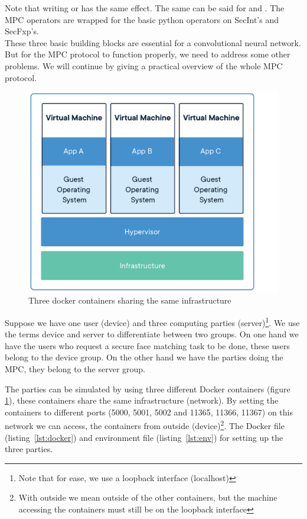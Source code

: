 Note that writing  or  has the same effect. The same can be said for  and . The MPC operators are wrapped for the basic python operators on SecInt's and SecFxp's.\\

These three basic building blocks are essential for a convolutional neural network. But for the MPC protocol to function properly, we need to address some other problems. We will continue by giving a practical overview of the whole MPC protocol.\\

\begin{figure}[H]
  \includegraphics[scale=0.25]{fig/dockercontainer.png}
  \centering
  \caption{Three docker containers sharing the same infrastructure}
  \label{fig:dockercontainer}
\end{figure}

Suppose we have one user (device) and three computing parties (server)\footnote{Note that for ease, we use a loopback interface (localhost)}. We use the terms device and server to differentiate between two groups. On one hand we have the users who request a secure face matching task to be done, these users belong to the device group. On the other hand we have the parties doing the MPC, they belong to the server group.

The parties can be simulated by using three different Docker containers (figure \ref{fig:dockercontainer}), these containers share the same infrastructure (network). By setting the containers to different ports (5000, 5001, 5002 and 11365, 11366, 11367) on this network we can access, the containers from outside (device)\footnote{With outside we mean outside of the other containers, but the machine accessing the containers must still be on the loopback interface}. The Docker file (listing~\ref{lst:docker}) and environment file (listing~\ref{lst:env}) for  setting up the three parties.

